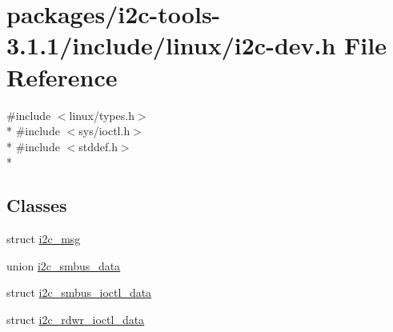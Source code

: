 \hypertarget{i2c-tools-3_81_81_2include_2linux_2i2c-dev_8h}{}\section{packages/i2c-\/tools-\/3.1.1/include/linux/i2c-\/dev.h File Reference}
\label{i2c-tools-3_81_81_2include_2linux_2i2c-dev_8h}
{\ttfamily \#include $<$linux/types.\+h$>$}\\*
{\ttfamily \#include $<$sys/ioctl.\+h$>$}\\*
{\ttfamily \#include $<$stddef.\+h$>$}\\*
\subsection*{Classes}
\begin{DoxyCompactItemize}
\item 
struct \hyperlink{structi2c__msg}{i2c\+\_\+msg}
\item 
union \hyperlink{unioni2c__smbus__data}{i2c\+\_\+smbus\+\_\+data}
\item 
struct \hyperlink{structi2c__smbus__ioctl__data}{i2c\+\_\+smbus\+\_\+ioctl\+\_\+data}
\item 
struct \hyperlink{structi2c__rdwr__ioctl__data}{i2c\+\_\+rdwr\+\_\+ioctl\+\_\+data}
\end{DoxyCompactItemize}
